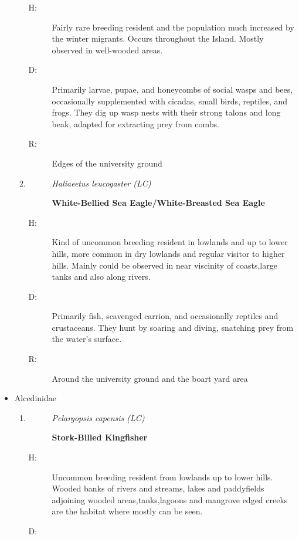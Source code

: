 \begin{itemize}
\begin{enumerate}
\begin{description}
\item[H: ]%
Fairly rare breeding resident and the population much increased by the winter migrants. Occurs throughout the Island. Mostly observed in well{-}wooded areas.%
\item[D: ]%
Primarily larvae, pupae, and honeycombs of social wasps and bees, occasionally supplemented with cicadas, small birds, reptiles, and frogs. They dig up wasp nests with their strong talons and long beak, adapted for extracting prey from combs.%
\item[R: ]%
Edges of the university ground%
\end{description}%
\item%
\begin{description}%
\item[]%
\textit{Haliaeetus leucogaster (LC)}%
\item[]%
\textbf{White{-}Bellied Sea Eagle/White{-}Breasted Sea Eagle}%
\end{description}%
\begin{description}%
\item[H: ]%
Kind of uncommon breeding resident in lowlands and up to lower hills, more common in dry lowlands and regular visitor to higher hills. Mainly could be observed in near viscinity of coasts,large tanks and also along rivers.%
\item[D: ]%
Primarily fish, scavenged carrion, and occasionally reptiles and crustaceans. They hunt by soaring and diving, snatching prey from the water's surface.%
\item[R: ]%
Around the university ground and the boart yard area%
\end{description}%
\end{enumerate}%
\item%
Alcedinidae%
\begin{enumerate}%
\item%
\begin{description}%
\item[]%
\textit{Pelargopsis capensis (LC)}%
\item[]%
\textbf{Stork{-}Billed Kingfisher}%
\end{description}%
\begin{description}%
\item[H: ]%
Uncommon breeding resident from lowlands up to lower hills. Wooded banks of rivers and streams, lakes and paddyfields adjoining wooded areas,tanks,lagoons and mangrove edged creeks are the habitat where mostly can be seen. %
\item[D: ]%

\end{description}
\end{enumerate}
\end{itemize}

